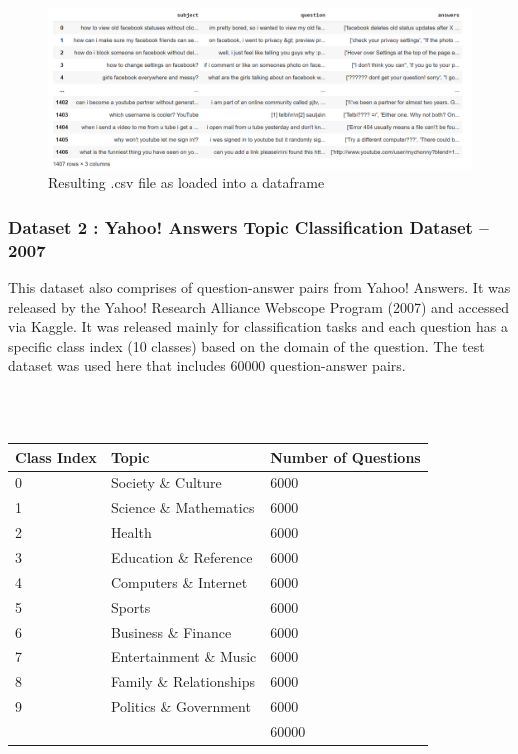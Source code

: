 \documentclass[12pt, a4paper]{article}
\begin{document}
\begin{figure}[h]
    \includegraphics[scale=0.4]{csvsnapshot.png} 
    \centering 
    \caption{Resulting .csv file as loaded into a dataframe}
    \centering 
\end{figure} 

\subsubsection{Dataset 2 : Yahoo! Answers Topic Classification Dataset – 2007} 

This dataset also comprises of question-answer pairs from Yahoo! Answers. It was released by the Yahoo! Research Alliance Webscope Program (2007) and accessed via Kaggle. \cite{dataset2} It was released mainly for classification tasks and each question has a specific class index (10 classes) based on the domain of the question. The test dataset was used here that includes 60000 question-answer pairs. 

\\~\\ 

\begin{center}
  \renewcommand{\arraystretch}{1.5}
  \begin{tabular}{p{2.5cm}|p{5cm}|p{2cm}}
    Class Index&Topic&Number of Questions\\ 
    \hline 
    0&Society \& Culture&6000 \\ 
    1&Science \& Mathematics&6000 \\ 
    2&Health&6000 \\ 
    3&Education \& Reference&6000 \\ 
    4&Computers \& Internet&6000 \\ 
    5&Sports&6000 \\ 
    6&Business \& Finance&6000 \\ 
    7&Entertainment \& Music&6000 \\ 
    8&Family \& Relationships&6000 \\ 
    9&Politics \& Government&6000 \\ 
    \hline
    &&60000 \\  
\end{tabular}
\end{center} 
\end{document}
